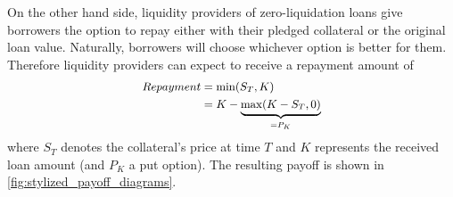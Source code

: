 \documentclass[a4paper]{article}
\begin{document}
On the other hand side, liquidity providers of zero-liquidation loans give borrowers the option to repay either with their pledged collateral or the original loan value. Naturally, borrowers will choose whichever option is better for them. Therefore liquidity providers can expect to receive a repayment amount of
\begin{equation}
\small
\begin{split}
Repayment &= \min(S_T, K) \\
&= K-\underbrace{\max(K-S_T, 0)}_{=P_K}
\end{split}
\end{equation}
where $S_T$ denotes the collateral's price at time $T$ and $K$ represents the received loan amount (and $P_K$ a put option). The resulting payoff is shown in \cref{fig:stylized_payoff_diagrams}. 

\end{document}
